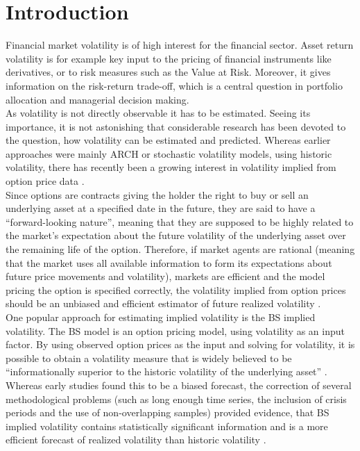 
\section{Introduction}\label{sec:1Intro}
Financial market volatility is of high interest for the financial sector. Asset return volatility is for example key input to the pricing of financial instruments like derivatives, or to risk measures such as the Value at Risk. Moreover, it gives information on the risk-return trade-off, which is a central question in portfolio allocation and managerial decision making. \\
As volatility is not directly observable it has to be estimated. Seeing its importance, it is not astonishing that considerable research has been devoted to the question, how volatility can be estimated and predicted. Whereas earlier approaches were mainly ARCH or stochastic volatility models, using historic volatility, there has recently been a growing interest in volatility implied from option price data \parencite{bakanova2010}.\\
Since options are contracts giving the holder the right to buy or sell an underlying asset at a specified date in the future, they are said to have a ``forward-looking nature'', meaning that they are supposed to be highly related to the market's expectation about the future volatility of the underlying asset over the remaining life of the option. Therefore, if market agents are rational (meaning that the market uses all available information to form its expectations about future price movements and volatility), markets are efficient and the model pricing the option is specified correctly, the volatility implied from option prices should be an unbiased and efficient estimator of future realized volatility \parencite{bakanova2010}.\\
One popular approach for estimating implied volatility is the \ac{BS} implied volatility. The \ac{BS} model is an option pricing model, using volatility as an input factor. By using observed option prices as the input and solving for volatility, it is possible to obtain a volatility measure that is widely believed to be ``informationally superior to the historic volatility of the underlying asset'' \parencite[p. 1305]{jiang2003}. Whereas early studies found this to be a biased forecast, the correction of several methodological problems (such as long enough time series, the inclusion of crisis periods and the use of non-overlapping samples) provided evidence, that \ac{BS} implied volatility contains statistically significant information and is a more efficient forecast of realized volatility than historic volatility \parencite{jiang2003}.\\
